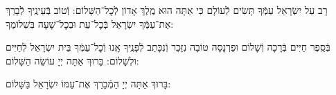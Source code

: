 \documentclass[twoside, openany, parskip=half, 11pt]{book}
\begin{document}
\maarivmodim

\alhanisim

\weekdaysahodos

רָב עַל יִשְׂרָאֵל עַמְּֿךָ תָּשִׂים לְֿעוֹלָם כִּי אַתָּה הוּא מֶֽלֶךְ אָדוֹן לְֿכׇל־הַשָּׁלוֹם: וְֿטוֹב בְּֿעֵינֶֽיךָ לְֿבָרֵךְ אֶת־עַמְּֿךָ יִשְׂרָאֵל בְּֿכׇל־עֵת וּבְכׇל־שָׁעָה בִּשְׁלוֹמֶךָ:
\vspace{-0.4\baselineskip}
\begin{paracol}{2}

\begin{small}
בְּֿסֵֽפֶר חַיִּים בְּֿרָכָה וְֿשָׁלוֹם וּפַרְנָסָה טוֹבָה נִזָּכֵר וְֿנִכָּתֵב לְֿפָנֶֽיךָ אָֽנוּ וְֿכׇל־עַמְּֿךָ בֵּית יִשְׂרָאֵל לְֿחַיִּים וּלְשָׁלוֹם: בָּרוּךְ אַתָּה יְיָ עוֹשֵׂה הַשָּׁלוֹם:

\end{small}
\switchcolumn
בָּרוּךְ אַתָּה יְיָ הַמְֿבָרֵךְ אֶת־עַמּוֹ יִשְׂרָאֵל בַּשָּׁלוֹם:

\end{paracol}



\tachanunim

\vspace{\baselineskip}
\halfkaddish
\end{document}
